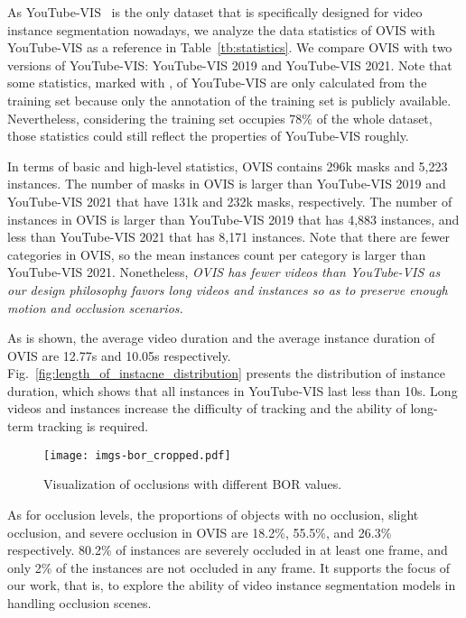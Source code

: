 \documentclass[twocolumn]{svjour3}          \smartqed  \usepackage{graphicx}
\begin{document}
\begin{sloppypar}
As YouTube-VIS~\cite{youtube_vis} is the only dataset that is specifically designed for video instance segmentation nowadays, we analyze the data statistics of OVIS with YouTube-VIS as a reference in Table~\ref{tb:statistics}. We compare OVIS with two versions of YouTube-VIS: YouTube-VIS 2019 and YouTube-VIS 2021. Note that some statistics, marked with , of YouTube-VIS are only calculated from the training set because only the annotation of the training set is publicly available. Nevertheless, considering the training set occupies 78\% of the whole dataset, those statistics could still reflect the properties of YouTube-VIS roughly.

In terms of basic and high-level statistics, OVIS contains 296k masks and 5,223 instances. The number of masks in OVIS is larger than YouTube-VIS 2019 and YouTube-VIS 2021 that have 131k and 232k masks, respectively. The number of instances in OVIS is larger than YouTube-VIS 2019 that has 4,883 instances, and less than YouTube-VIS 2021 that has 8,171 instances. Note that there are fewer categories in OVIS, so the mean instances count per category is larger than YouTube-VIS 2021. Nonetheless, \textit{OVIS has fewer videos than YouTube-VIS as our design philosophy favors long videos and instances so as to preserve enough motion and occlusion scenarios.}

As is shown, the average video duration and the average instance duration of OVIS are 12.77s and 10.05s respectively. Fig.~\ref{fig:length_of_instacne_distribution} presents the distribution of instance duration, which shows that all instances in YouTube-VIS last less than 10s. Long videos and instances increase the difficulty of tracking and the ability of long-term tracking is required.

\begin{figure}[t]
\centering
         \texttt{[image: imgs-bor\_cropped.pdf]}
         \caption{Visualization of occlusions with different BOR values. }
      \label{fig:bor}
\end{figure}

As for occlusion levels, the proportions of objects with no occlusion, slight occlusion, and severe occlusion in OVIS are 18.2\%, 55.5\%, and 26.3\% respectively. 80.2\% of instances are severely occluded in at least one frame, and only 2\% of the instances are not occluded in any frame. It supports the focus of our work, that is, to explore the ability of video instance segmentation models in handling occlusion scenes.


\end{sloppypar}
\end{document}
